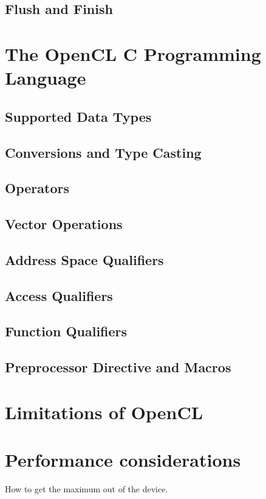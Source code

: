 \subsection{Flush and Finish}


\section{The OpenCL C Programming Language}

\subsection{Supported Data Types}

\subsection{Conversions and Type Casting}

\subsection{Operators}

\subsection{Vector Operations}

\subsection{Address Space Qualifiers}

\subsection{Access Qualifiers}

\subsection{Function Qualifiers}

\subsection{Preprocessor Directive and Macros}


\section{Limitations of OpenCL}


\section{Performance considerations}
How to get the maximum out of the device.

